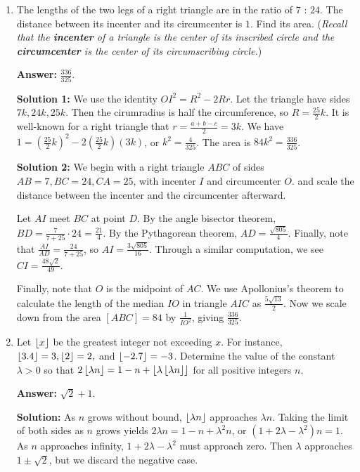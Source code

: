 \documentclass[11pt,paper=letter]{scrartcl}
\begin{document}
\begin{enumerate}[left=0pt]
\item The lengths of the two legs of a right triangle are in the ratio of $7$ : $24$. The distance between its incenter and its circumcenter is $1$. Find its area. (\emph{Recall that the \textbf{incenter} of a triangle is the center of its inscribed circle and the \textbf{circumcenter} is the center of its circumscribing circle.})

\textbf{Answer:} $\boxed{\frac{336}{325}}$.

\textbf{Solution 1:} We use the identity $OI^2 = R^2 - 2Rr.$ Let the triangle have sides $7k, 24k, 25k$. Then the cirumradius is half the circumference, so $R = \frac{25}{2}k$. It is well-known for a right triangle that $r = \frac{a+b-c}{2} = 3k$. We have $1 = (\frac{25}{2}k)^2 - 2(\frac{25}{2}k)(3k)$, or $k^2 = \frac{4}{325}$. The area is $84k^2 = \frac{336}{325}$.

\textbf{Solution 2:} We begin with a right triangle $ABC$ of sides $AB = 7, BC = 24, CA = 25$, with incenter $I$ and circumcenter $O$. and scale the distance between the incenter and the circumcenter afterward.

Let $AI$ meet $BC$ at point $D$. By the angle bisector theorem, $BD = \frac{7}{7+25}\cdot24 = \frac{21}{4}$. By the Pythagorean theorem, $AD = \frac{\sqrt{805}}{4}$. Finally, note that $\frac{AI}{AD} = \frac{24}{7 + 25}$, so $AI = \frac{3\sqrt{805}}{16}$. Through a similar computation, we see $CI = \frac{48\sqrt{2}}{49}$.

Finally, note that $O$ is the midpoint of $AC$. We use Apollonius's theorem to calculate the length of the median $IO$ in triangle $AIC$ as $\frac{5\sqrt{13}}{2}$. Now we scale down from the area $[ABC] = 84$ by $\frac{1}{IO^2}$, giving $\frac{336}{325}$.

\item Let $\left\lfloor x \right\rfloor$ be the greatest integer not exceeding $x$. For instance, $\left\lfloor 3.4 \right\rfloor = 3, \left\lfloor 2 \right\rfloor = 2,$ and $\left\lfloor -2.7 \right\rfloor = -3$. Determine the value of the constant $\lambda > 0$ so that $2\left\lfloor \lambda n \right\rfloor = 1 - n + \left\lfloor \lambda\left\lfloor \lambda n \right\rfloor \right\rfloor$ for all positive integers $n$.

\textbf{Answer:} $\boxed{\sqrt{2} + 1}$.

\textbf{Solution:} As $n$ grows without bound, $\left\lfloor \lambda n \right\rfloor$ approaches $\lambda n$. Taking the limit of both sides as $n$ grows yields $2\lambda n = 1 - n + \lambda^2 n$, or $(1 + 2\lambda - \lambda^2)n = 1$. As $n$ approaches infinity, $1 + 2\lambda - \lambda^2$ must approach zero. Then $\lambda$ approaches $1 \pm \sqrt{2}$, but we discard the negative case.


\end{enumerate}
\end{document}

